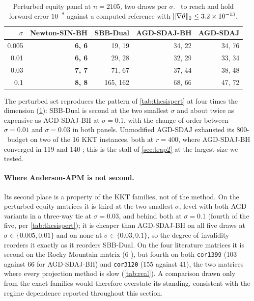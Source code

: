 \begin{table}[t]
\centering
\caption{Perturbed equity panel at $n=2105$, two draws per $\sigma$. \EVDs\ to
reach and hold forward error $10^{-8}$ against a computed reference with
$\lVert \nabla\theta\rVert_2\le3.2\times10^{-13}$.}
\label{tab:us2105pert}
\small
\begin{tabular}{rrrrr}
\toprule
$\sigma$ & Newton-SIN-BH & SBB-Dual & AGD-SDAJ-BH & AGD-SDAJ\\
\midrule
0.005 & \textbf{6, 6} & 19, 19   & 34, 22 & 34, 76\\
0.01  & \textbf{6, 6} & 29, 28   & 32, 29 & 33, 34\\
0.03  & \textbf{7, 7} & 71, 67   & 37, 44 & 38, 48\\
0.1   & \textbf{8, 8} & 165, 162 & 68, 66 & 47, 72\\
\bottomrule
\end{tabular}
\end{table}

The perturbed set reproduces the pattern of \cref{tab:thesispert} at four times
the dimension (\cref{tab:us2105pert}): SBB-Dual is second at the two smallest
$\sigma$ and about twice as expensive as AGD-SDAJ-BH at $\sigma=0.1$, with the
change of order between $\sigma=0.01$ and $\sigma=0.03$ in both panels.
Unmodified AGD-SDAJ exhausted its 800-\EVD\ budget on two of the 16 KKT
instances, both at $r=400$, where AGD-SDAJ-BH converged in 119 and 140 \EVDs;
this is the stall of \cref{sec:trap2} at the largest size we tested.

\paragraph{Where Anderson-APM is not second.}
Its second place is a property of the KKT families, not of the method. On the
perturbed equity matrices it is third at the two smallest $\sigma$, level with
both AGD variants in a three-way tie at $\sigma=0.03$, and behind both at
$\sigma=0.1$ (fourth of the five, per \cref{tab:thesispert}); it is cheaper
than AGD-SDAJ-BH on all five draws at $\sigma\in\{0.005,0.01\}$ and on none at
$\sigma\in\{0.03,0.1\}$, so the degree of invalidity reorders it exactly as it
reorders SBB-Dual. On the four literature matrices it
is second on the Rocky Mountain matrix (6 \EVDs), but fourth on both
\texttt{cor1399} (103 against 66 for AGD-SDAJ-BH) and
\texttt{cor3120} (155 against 41), the two matrices where every projection
method is slow (\cref{tab:real}). A comparison drawn only from the exact
families would therefore overstate its standing, consistent with the regime
dependence reported throughout this section.

